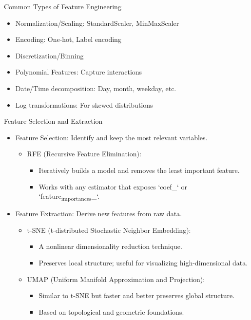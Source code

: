 \documentclass[aspectratio=169]{beamer}
\begin{document}
\begin{frame}[label={sec:orgbcf3af6}]{Common Types of Feature Engineering}
\begin{itemize}
\item \alert{Normalization/Scaling}: StandardScaler, MinMaxScaler
\item \alert{Encoding}: One-hot, Label encoding
\item \alert{Discretization/Binning}
\item \alert{Polynomial Features}: Capture interactions
\item \alert{Date/Time decomposition}: Day, month, weekday, etc.
\item \alert{Log transformations}: For skewed distributions
\end{itemize}
\end{frame}

\begin{frame}[label={sec:org5851767}]{Feature Selection and Extraction}
\begin{itemize}
\item \alert{Feature Selection}: Identify and keep the most relevant variables.
\begin{itemize}
\item \alert{RFE (Recursive Feature Elimination)}:
\begin{itemize}
\item Iteratively builds a model and removes the least important feature.
\item Works with any estimator that exposes `coef\_` or `feature\textsubscript{importances}\_`.
\end{itemize}
\end{itemize}
\item \alert{Feature Extraction}: Derive new features from raw data.
\begin{itemize}
\item \alert{t-SNE (t-distributed Stochastic Neighbor Embedding)}:
\begin{itemize}
\item A nonlinear dimensionality reduction technique.
\item Preserves local structure; useful for visualizing high-dimensional data.
\end{itemize}
\item \alert{UMAP (Uniform Manifold Approximation and Projection)}:
\begin{itemize}
\item Similar to t-SNE but faster and better preserves global structure.
\item Based on topological and geometric foundations.
\end{itemize}
\end{itemize}
\end{itemize}
\end{frame}
\end{document}
